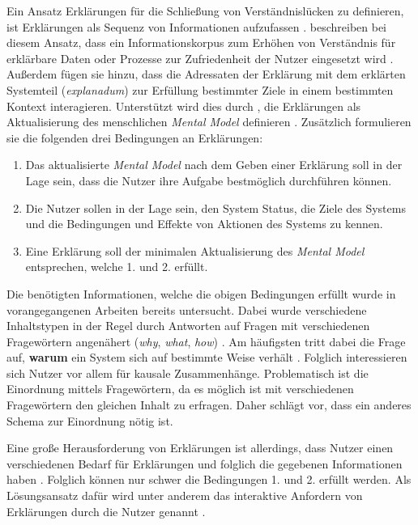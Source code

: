 Ein Ansatz Erklärungen für die Schließung von Verständnislücken zu definieren, ist Erklärungen als Sequenz von Informationen aufzufassen \cite[vgl.][]{wang_integration_2020}. \citeauthor{sovrano_modelling_2020} beschreiben bei diesem Ansatz, dass ein Informationskorpus zum Erhöhen von Verständnis für erklärbare Daten oder Prozesse zur Zufriedenheit der Nutzer eingesetzt wird \cite[übersetzt vgl.][]{sovrano_modelling_2020}. Außerdem fügen sie hinzu, dass die Adressaten der Erklärung mit dem erklärten Systemteil (\textit{explanadum}) zur Erfüllung bestimmter Ziele in einem bestimmten Kontext interagieren. Unterstützt wird dies durch \citeauthor{zahedi_towards_2019}, die Erklärungen als \glqq Aktualisierung des menschlichen \textit{Mental Model}\grqq{} definieren \cite[übersetzt vgl.][]{zahedi_towards_2019}. Zusätzlich formulieren sie die folgenden drei Bedingungen an Erklärungen:
\begin{enumerate}
    \item Das aktualisierte \textit{Mental Model} nach dem Geben einer Erklärung soll in der Lage sein, dass die Nutzer ihre Aufgabe bestmöglich durchführen können.
    \item Die Nutzer sollen in der Lage sein, den System Status, die Ziele des Systems und die Bedingungen und Effekte von Aktionen des Systems zu kennen.
    \item Eine Erklärung soll der minimalen Aktualisierung des \textit{Mental Model} entsprechen, welche 1. und 2. erfüllt.
\end{enumerate}

Die benötigten Informationen, welche die obigen Bedingungen erfüllt wurde in vorangegangenen Arbeiten bereits untersucht. Dabei wurde verschiedene Inhaltstypen in der Regel durch Antworten auf Fragen mit verschiedenen Fragewörtern angenähert (\textit{why}, \textit{what}, \textit{how}) \cite{rosenfeld_explainability_2019}. Am häufigsten tritt dabei die Frage auf, \textbf{warum} ein System sich auf bestimmte Weise verhält \cite{chazette2020explainability}. Folglich interessieren sich Nutzer vor allem für kausale Zusammenhänge. Problematisch ist die Einordnung mittels Fragewörtern, da es möglich ist mit verschiedenen Fragewörtern den gleichen Inhalt zu erfragen. Daher schlägt \citeauthor{wang_integration_2020} vor, dass ein anderes Schema zur Einordnung nötig ist.

Eine große Herausforderung von Erklärungen ist allerdings, dass Nutzer einen verschiedenen Bedarf für Erklärungen und folglich die gegebenen Informationen haben \cite{chazette2020explainability}. Folglich können nur schwer die Bedingungen 1. und 2. erfüllt werden. Als Lösungsansatz dafür wird unter anderem das interaktive Anfordern von Erklärungen durch die Nutzer genannt \cite{chazette_end-users_nodate}.

